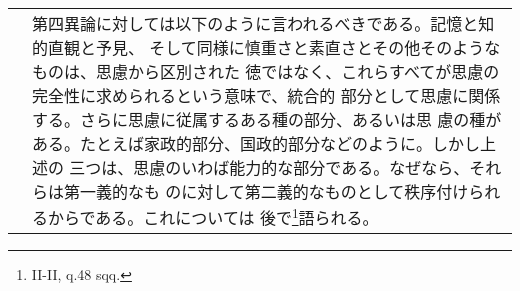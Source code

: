 \documentclass[10pt]{jsarticle}
\begin{document}
\begin{longtable}{p{21em}p{21em}}
&

第四異論に対しては以下のように言われるべきである。記憶と知的直観と予見、
そして同様に慎重さと素直さとその他そのようなものは、思慮から区別された
徳ではなく、これらすべてが思慮の完全性に求められるという意味で、統合的
部分として思慮に関係する。さらに思慮に従属するある種の部分、あるいは思
慮の種がある。たとえば家政的部分、国政的部分などのように。しかし上述の
三つは、思慮のいわば能力的な部分である。なぜなら、それらは第一義的なも
のに対して第二義的なものとして秩序付けられるからである。これについては
後で\footnote{II-II, q.48 sqq.}語られる。

\end{longtable}
\newpage
\end{document}
